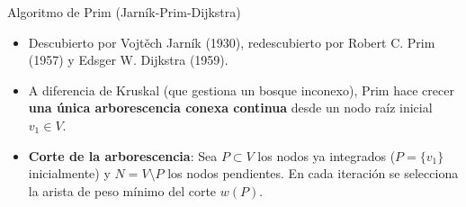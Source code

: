 \documentclass[
  ignorenonframetext,
]{beamer}
\providecommand{\tightlist}{%
  \setlength{\itemsep}{0pt}\setlength{\parskip}{0pt}}
\begin{document}
\begin{frame}{Algoritmo de Prim (Jarník-Prim-Dijkstra)}
\label{algoritmo-de-prim-jarnuxedk-prim-dijkstra}
\begin{tcolorbox}[enhanced jigsaw, left=2mm, opacityback=0, titlerule=0mm, breakable, toptitle=1mm, rightrule=.15mm, bottomtitle=1mm, coltitle=black, title=\textcolor{quarto-callout-note-color}{\faInfo}\hspace{0.5em}{Historia y Filosofía del Algoritmo de Prim (1957)}, colframe=quarto-callout-note-color-frame, colbacktitle=quarto-callout-note-color!10!white, arc=.35mm, toprule=.15mm, leftrule=.75mm, bottomrule=.15mm, opacitybacktitle=0.6, colback=white]

\begin{itemize}
\tightlist
\item
  Descubierto por Vojtěch Jarník (1930), redescubierto por Robert C.
  Prim (1957) y Edsger W. Dijkstra (1959).
\item
  A diferencia de Kruskal (que gestiona un bosque inconexo), Prim hace
  crecer \textbf{una única arborescencia conexa continua} desde un nodo
  raíz inicial \(v_1 \in V\).
\end{itemize}

\end{tcolorbox}

\begin{itemize}
\tightlist
\item
  \textbf{Corte de la arborescencia}: Sea \(P \subset V\) los nodos ya
  integrados (\(P = \{v_1\}\) inicialmente) y \(N = V \setminus P\) los
  nodos pendientes. En cada iteración se selecciona la arista de peso
  mínimo del corte \(w(P)\).
\end{itemize}
\end{frame}
\end{document}
